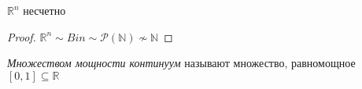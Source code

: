 \begin{theorem}
    $\mathbb{R}^n$ несчетно
\end{theorem}
\begin{proof}
    $\mathbb{R}^n \sim Bin \sim \mathcal{P}(\mathbb{N}) \not\sim \mathbb{N}$
\end{proof}

\begin{theorem}
    \textit{Множеством мощности континуум} называют множество, равномощное
    $[0, 1] \subseteq \mathbb{R}$
\end{theorem}

\newpage
